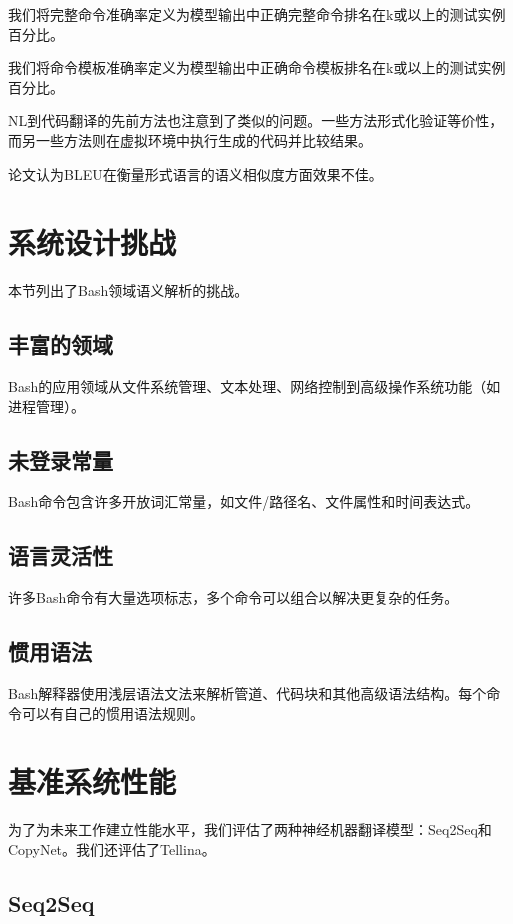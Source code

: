 我们将完整命令准确率定义为模型输出中正确完整命令排名在k或以上的测试实例百分比。

我们将命令模板准确率定义为模型输出中正确命令模板排名在k或以上的测试实例百分比。

NL到代码翻译的先前方法也注意到了类似的问题。一些方法形式化验证等价性，而另一些方法则在虚拟环境中执行生成的代码并比较结果。

论文认为BLEU在衡量形式语言的语义相似度方面效果不佳。

\section{系统设计挑战}

本节列出了Bash领域语义解析的挑战。

\subsection{丰富的领域}

Bash的应用领域从文件系统管理、文本处理、网络控制到高级操作系统功能（如进程管理）。

\subsection{未登录常量}

Bash命令包含许多开放词汇常量，如文件/路径名、文件属性和时间表达式。

\subsection{语言灵活性}

许多Bash命令有大量选项标志，多个命令可以组合以解决更复杂的任务。

\subsection{惯用语法}

Bash解释器使用浅层语法文法来解析管道、代码块和其他高级语法结构。每个命令可以有自己的惯用语法规则。

\section{基准系统性能}

为了为未来工作建立性能水平，我们评估了两种神经机器翻译模型：Seq2Seq和CopyNet。我们还评估了Tellina。

\subsection{Seq2Seq}

